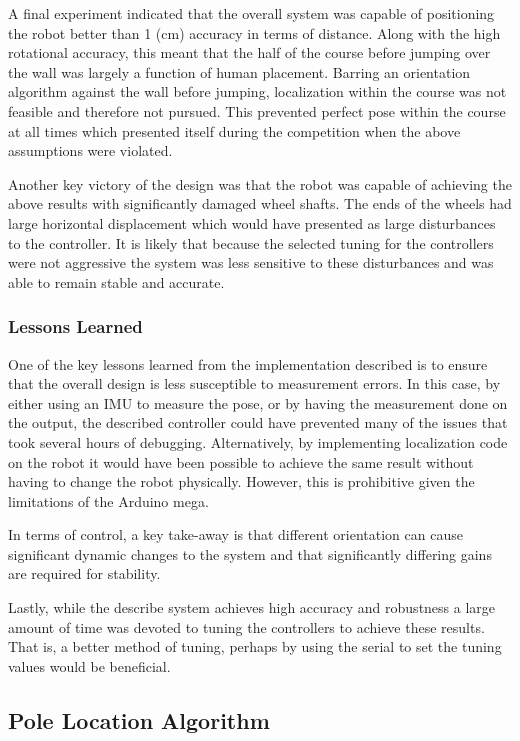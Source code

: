 \documentclass[ece]{uw-wkrpt}
\begin{document}
A final experiment indicated that the overall system was capable of positioning the robot better than 1 (cm) accuracy in terms of distance. Along with the high rotational accuracy, this meant that the half of the course before jumping over the wall was largely a function of human placement. Barring an orientation algorithm against the wall before jumping, localization within the course was not feasible and therefore not pursued. This prevented perfect pose within the course at all times which presented itself during the competition when the above assumptions were violated. 

Another key victory of the design was that the robot was capable of achieving the above results with significantly damaged wheel shafts. The ends of the wheels had large horizontal displacement which would have presented as large disturbances to the controller. It is likely that because the selected tuning for the controllers were not aggressive the system was less sensitive to these disturbances and was able to remain stable and accurate.

\subsubsection{Lessons Learned}

One of the key lessons learned from the implementation described is to ensure that the overall design is less susceptible to measurement errors. In this case, by either using an IMU to measure the pose, or by having the measurement done on the output, the described controller could have prevented many of the issues that took several hours of debugging. Alternatively, by implementing localization code on the robot it would have been possible to achieve the same result without having to change the robot physically. However, this is prohibitive given the limitations of the Arduino mega. 

In terms of control, a key take-away is that different orientation can cause significant dynamic changes to the system and that significantly differing gains are required for stability. 

Lastly, while the describe system achieves high accuracy and robustness a large amount of time was devoted to tuning the controllers to achieve these results. That is, a better method of tuning, perhaps by using the serial to set the tuning values would be beneficial. 

\subsection{Pole Location Algorithm}
\end{document}

